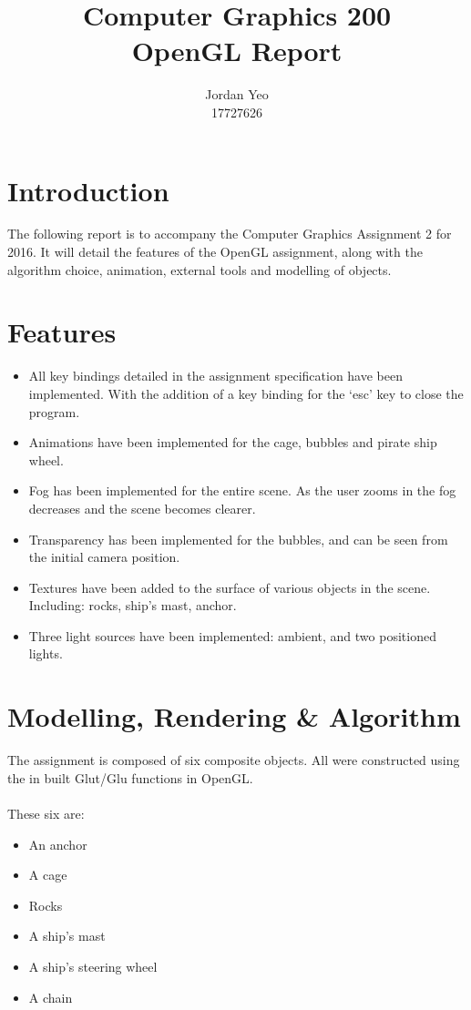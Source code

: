 \documentclass[]{article}
\title{Computer Graphics 200 \\
		OpenGL Report}
\author{Jordan Yeo\\
	     17727626\\ }
\begin{document}
\maketitle
\thispagestyle{empty}
\break

\clearpage
{} 
\section{Introduction}

The following report is to accompany the Computer Graphics Assignment 2 for 2016. It will detail the features of the OpenGL assignment, along with the algorithm choice, animation, external tools and modelling of objects.




\section{Features}
\begin{itemize}
	\item All key bindings detailed in the assignment specification have been implemented. With the addition of a key binding for the `esc' key to close the program.
	\item Animations have been implemented for the cage, bubbles and pirate ship wheel.
	\item Fog has been implemented for the entire scene. As the user zooms in the fog decreases and the scene becomes clearer.
	\item Transparency has been implemented for the bubbles, and can be seen from the initial camera position. 
	\item Textures have been added to the surface of various objects in the scene. Including: rocks, ship's mast, anchor.
	\item Three light sources have been implemented: ambient, and two positioned lights.
\end{itemize}

\section{Modelling, Rendering \& Algorithm}
The assignment is composed of six composite objects. All were constructed using the in built Glut/Glu functions in OpenGL. \\ \\
These six are: 

\begin{itemize}
	\item An anchor 
	\item A cage
	\item Rocks
	\item A ship's mast
	\item A ship's steering wheel
	\item A chain
\end{itemize}
\end{document}
